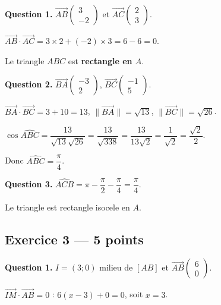 
\textbf{Question 1.}
$\overrightarrow{AB}\begin{pmatrix} 3 \\ -2 \end{pmatrix}$ et $\overrightarrow{AC}\begin{pmatrix} 2 \\ 3 \end{pmatrix}$.

$\overrightarrow{AB} \cdot \overrightarrow{AC} = 3 \times 2 + (-2) \times 3 = 6 - 6 = 0$.

Le triangle $ABC$ est \textbf{rectangle en $A$}.

\textbf{Question 2.}
$\overrightarrow{BA}\begin{pmatrix} -3 \\ 2 \end{pmatrix}$, $\overrightarrow{BC}\begin{pmatrix} -1 \\ 5 \end{pmatrix}$.

$\overrightarrow{BA} \cdot \overrightarrow{BC} = 3 + 10 = 13$, $\|\overrightarrow{BA}\| = \sqrt{13}$, $\|\overrightarrow{BC}\| = \sqrt{26}$.

$\cos\widehat{ABC} = \dfrac{13}{\sqrt{13}\sqrt{26}} = \dfrac{13}{\sqrt{338}} = \dfrac{13}{13\sqrt{2}} = \dfrac{1}{\sqrt{2}} = \dfrac{\sqrt{2}}{2}$.

Donc $\widehat{ABC} = \dfrac{\pi}{4}$.

\textbf{Question 3.}
$\widehat{ACB} = \pi - \dfrac{\pi}{2} - \dfrac{\pi}{4} = \dfrac{\pi}{4}$.

Le triangle est rectangle isocele en $A$.

\subsection*{Exercice 3 — 5 points}


\textbf{Question 1.}
$I = (3; 0)$ milieu de $[AB]$ et $\overrightarrow{AB}\begin{pmatrix} 6 \\ 0 \end{pmatrix}$.

$\overrightarrow{IM} \cdot \overrightarrow{AB} = 0$ : $6(x - 3) + 0 = 0$, soit $x = 3$.

